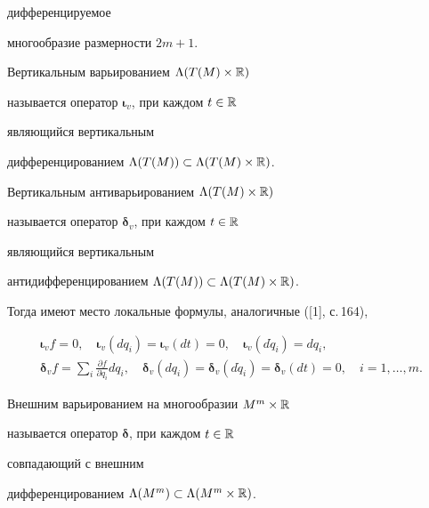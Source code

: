 дифференцируемое 


многообразие размерности $2m+1$. 


 


\begin{defn} 


Вертикальным варьированием $\Lambda(T(M)\times\Bbb R)$ 


называется оператор $\boldsymbol \iota_v$, при каждом $t\in\Bbb R$


являющийся вертикальным 


дифференцированием $\Lambda(T(M))\subset\Lambda(T(M)\times\Bbb R)$. 


\end{defn} 


 


\begin{defn} 


Вертикальным антиварьированием $\Lambda(T(M)\times\Bbb R)$ 


называется оператор $\boldsymbol \delta_v$, при каждом $t\in\Bbb R$


являющийся вертикальным 


антидифференцированием $\Lambda(T(M))\subset\Lambda(T(M)\times\Bbb R)$. 


\end{defn} 


 


Тогда имеют место локальные формулы, аналогичные ([1], с.\,164), 


\begin{gather*} 


\boldsymbol \iota_v f=0,\quad \boldsymbol \iota_v(dq_i)=


\boldsymbol \iota_v(dt)=0,\quad 


\boldsymbol \iota_v(d\Dot q_i)=dq_i,\\ 


\boldsymbol \delta_v f=\sum_i\frac{\partial f}{\partial\Dot q_i}dq_i,\quad 


\boldsymbol \delta_v(dq_i)=\boldsymbol \delta_v(d\Dot q_i)=


\boldsymbol \delta_v(dt)=0,\quad 


i=1,\dotsc,m. 


\end{gather*} 


 


\begin{defn} 


Внешним варьированием на многообразии $M^m\times\Bbb R$ 


называется оператор $\boldsymbol \delta$, при каждом $t\in\Bbb R$


совпадающий с внешним 


дифференцированием $\Lambda(M^m)\subset \Lambda(M^m\times\Bbb R)$. 


\end{defn} 


